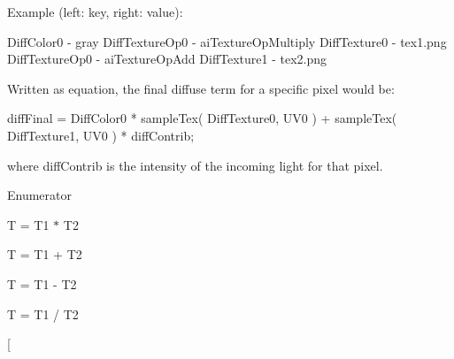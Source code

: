 Example (left\+: key, right\+: value)\+: 
\begin{DoxyPre} DiffColor0     - gray
DiffTextureOp0 - aiTextureOpMultiply
DiffTexture0   - tex1.png
DiffTextureOp0 - aiTextureOpAdd
DiffTexture1   - tex2.png\end{DoxyPre}
 Written as equation, the final diffuse term for a specific pixel would be\+: 
\begin{DoxyPre}diffFinal = DiffColor0 * sampleTex( DiffTexture0, UV0 ) +
    sampleTex( DiffTexture1, UV0 ) * diffContrib;\end{DoxyPre}
 where {\ttfamily diff\+Contrib} is the intensity of the incoming light for that pixel. \begin{Desc}
\item[Enumerator]\par
\begin{description}
\item[{\em 
\hypertarget{namespaceassimp_1_1material_ab30a105144c2d883a472a0da51309df3a54ec2cbf30b354b753b0e185531c4739}{Multiply}\label{namespaceassimp_1_1material_ab30a105144c2d883a472a0da51309df3a54ec2cbf30b354b753b0e185531c4739}
}]{\ttfamily T = T1 $\ast$ T2} \item[{\em 
\hypertarget{namespaceassimp_1_1material_ab30a105144c2d883a472a0da51309df3ab1d93585972e3eb0c3c35991b3e9cc39}{Add}\label{namespaceassimp_1_1material_ab30a105144c2d883a472a0da51309df3ab1d93585972e3eb0c3c35991b3e9cc39}
}]{\ttfamily T = T1 + T2} \item[{\em 
\hypertarget{namespaceassimp_1_1material_ab30a105144c2d883a472a0da51309df3aabc06a2289691c9dd01d14b9d18b0240}{Subtract}\label{namespaceassimp_1_1material_ab30a105144c2d883a472a0da51309df3aabc06a2289691c9dd01d14b9d18b0240}
}]{\ttfamily T = T1 -\/ T2} \item[{\em 
\hypertarget{namespaceassimp_1_1material_ab30a105144c2d883a472a0da51309df3a80cb06984fe800e37818f04c9e5ed7ba}{Divide}\label{namespaceassimp_1_1material_ab30a105144c2d883a472a0da51309df3a80cb06984fe800e37818f04c9e5ed7ba}
}]{\ttfamily T = T1 / T2} \item[{\em 
}
\end{description}
\end{Desc}
